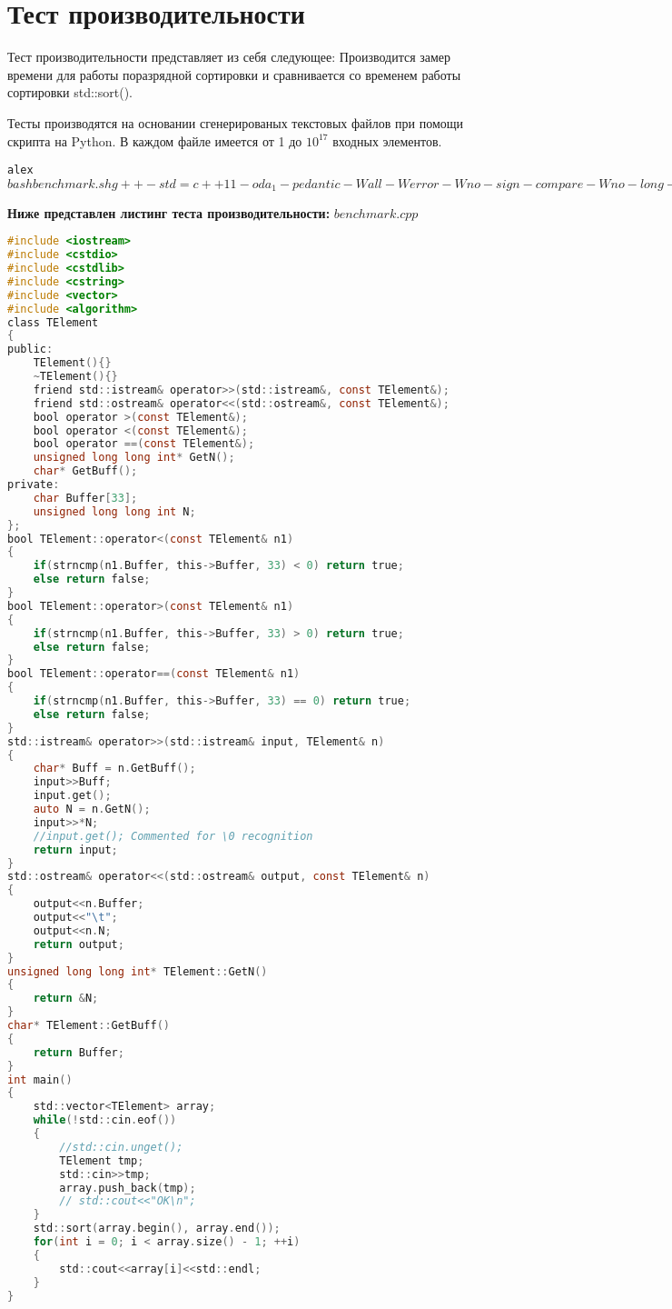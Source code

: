 \section{Тест производительности}

Тест производительности представляет из себя следующее: Производится замер времени для работы поразрядной сортировки и сравнивается со временем работы сортировки std::sort().

Тесты производятся на основании сгенерированых текстовых файлов при помощи скрипта на Python. В каждом файле имеется от 1 до $10^17$ входных элементов.

\begin{alltt}
alex$ bash benchmark.sh 
g++ -std=c++11 -o da_1 -pedantic -Wall -Werror -Wno-sign-compare -Wno-long-long -lm main.cpp sort.cpp 
Time for Radix Sort

real	0m20.225s
user	0m19.748s
sys		0m0.472s
Time for std::sort()

real	0m28.851s
user	0m27.836s
sys		0m1.000s
alex$
\end{alltt}
\textbf{Ниже представлен листинг теста производительности:}
$benchmark.cpp$
\begin{lstlisting}[language=C]
#include <iostream>
#include <cstdio>
#include <cstdlib>
#include <cstring>
#include <vector>
#include <algorithm>
class TElement
{
public:
    TElement(){}
    ~TElement(){}
    friend std::istream& operator>>(std::istream&, const TElement&);
    friend std::ostream& operator<<(std::ostream&, const TElement&);
    bool operator >(const TElement&);
    bool operator <(const TElement&);
    bool operator ==(const TElement&);
    unsigned long long int* GetN();
    char* GetBuff();
private:
    char Buffer[33];
    unsigned long long int N;
};
bool TElement::operator<(const TElement& n1)
{
    if(strncmp(n1.Buffer, this->Buffer, 33) < 0) return true;
    else return false;
}
bool TElement::operator>(const TElement& n1)
{
    if(strncmp(n1.Buffer, this->Buffer, 33) > 0) return true;
    else return false;
}
bool TElement::operator==(const TElement& n1)
{
    if(strncmp(n1.Buffer, this->Buffer, 33) == 0) return true;
    else return false;
}
std::istream& operator>>(std::istream& input, TElement& n)
{
    char* Buff = n.GetBuff();
    input>>Buff;
    input.get();
    auto N = n.GetN();
    input>>*N;
    //input.get(); Commented for \0 recognition
    return input;
}
std::ostream& operator<<(std::ostream& output, const TElement& n)
{
    output<<n.Buffer;
    output<<"\t";
    output<<n.N;
    return output;
}
unsigned long long int* TElement::GetN()
{
    return &N;
}
char* TElement::GetBuff()
{
    return Buffer;
}
int main()
{
    std::vector<TElement> array;
    while(!std::cin.eof())
    {
        //std::cin.unget();
        TElement tmp;
        std::cin>>tmp;
        array.push_back(tmp);
        // std::cout<<"OK\n";
    }
    std::sort(array.begin(), array.end());
    for(int i = 0; i < array.size() - 1; ++i)
    {
        std::cout<<array[i]<<std::endl;
    }
}
\end{lstlisting}

